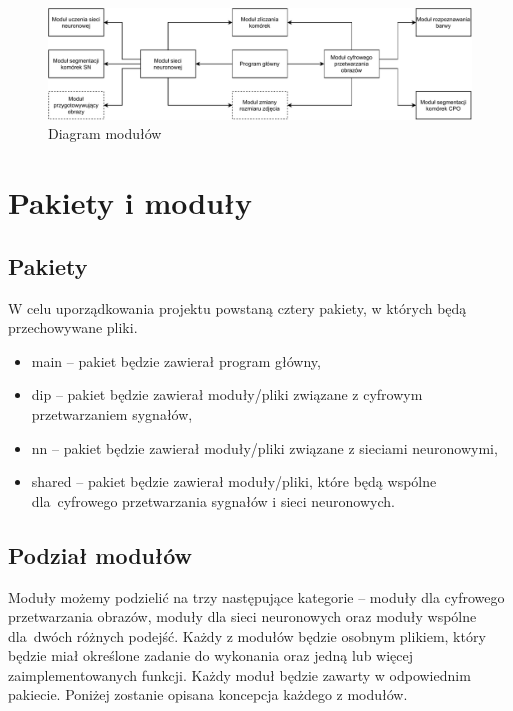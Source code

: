 \documentclass[a4paper]{article}
\begin{document}
\begin{figure}[h!]
    \centering
    \includegraphics[width=1\textwidth, height=0.2\textheight, trim={0cm 0cm 0cm 0cm}]{diagram.pdf}
    \caption{Diagram modułów}
    \label{fig:diagram}
\end{figure}

\section{Pakiety i moduły}
\subsection{Pakiety}
W celu uporządkowania projektu powstaną cztery pakiety, w których będą przechowywane pliki.
\begin{itemize}
    \item main -- pakiet będzie zawierał program główny,
    \item dip -- pakiet będzie zawierał moduły/pliki związane z cyfrowym przetwarzaniem sygnałów,
    \item nn -- pakiet będzie zawierał moduły/pliki związane z sieciami neuronowymi,
    \item shared -- pakiet będzie zawierał moduły/pliki, które będą wspólne dla~cyfrowego przetwarzania sygnałów i sieci neuronowych.
\end{itemize}
\subsection{Podział modułów}
Moduły możemy podzielić na trzy następujące kategorie -- moduły dla cyfrowego przetwarzania obrazów, moduły dla sieci neuronowych oraz moduły wspólne dla~dwóch różnych podejść. Każdy z modułów będzie osobnym plikiem, który będzie miał określone zadanie do wykonania oraz jedną lub więcej zaimplementowanych funkcji. Każdy moduł będzie zawarty w odpowiednim pakiecie. Poniżej zostanie opisana koncepcja każdego z modułów.
\end{document}
